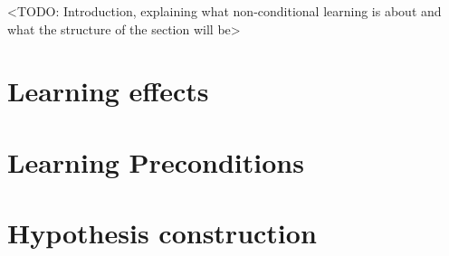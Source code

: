 \documentclass[Master.tex]{subfiles}
\begin{document}
<TODO: Introduction, explaining what non-conditional learning is about and what the structure of the section will be>

\section{Learning effects}
    

\section{Learning Preconditions}
    

\section{Hypothesis construction}
	
\end{document}
